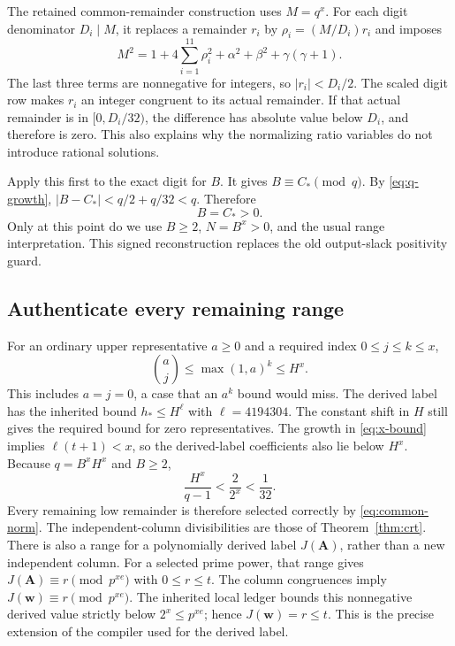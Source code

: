 \documentclass[11pt]{article}
\theoremstyle{definition}
\begin{document}
The retained common-remainder construction uses $M=q^x$. For each
digit denominator $D_i\mid M$, it replaces a remainder $r_i$ by
$\rho_i=(M/D_i)r_i$ and imposes
\begin{equation}\label{eq:common-norm}
 M^2=1+4\sum_{i=1}^{11}\rho_i^2+\alpha^2+\beta^2+\gamma(\gamma+1).
\end{equation}
The last three terms are nonnegative for integers, so $|r_i|<D_i/2$.
The scaled digit row makes $r_i$ an integer congruent to its actual
remainder. If that actual remainder is in $[0,D_i/32)$, the difference
has absolute value below $D_i$, and therefore is zero. This also explains
why the normalizing ratio variables do not introduce rational solutions.

Apply this first to the exact digit for $B$. It gives
$B\equiv C_*\pmod q$. By \eqref{eq:q-growth},
$|B-C_*|<q/2+q/32<q$. Therefore
\[
                         B=C_*>0.
\]
Only at this point do we use $B\ge2$, $N=B^x>0$, and the usual range
interpretation. This signed reconstruction replaces the old output-slack
positivity guard.

\subsection{Authenticate every remaining range}

For an ordinary upper representative $a\ge0$ and a required index
$0\le j\le k\le x$,
\[
 \binom aj\le\max(1,a)^k\le H^x.
\]
This includes $a=j=0$, a case that an $a^k$ bound would miss. The
derived label has the inherited bound $h_*\le H^{\ell}$ with
$\ell=4194304$. The constant shift in $H$ still gives the required
bound for zero representatives. The growth in \eqref{eq:x-bound}
implies $\ell(t+1)<x$, so the derived-label coefficients also lie below
$H^x$. Because $q=B^xH^x$ and $B\ge2$,
\[
                  \frac{H^x}{q-1}<\frac2{2^x}<\frac1{32}.
\]
Every remaining low remainder is therefore selected correctly by
\eqref{eq:common-norm}. The independent-column divisibilities are those
of Theorem~\ref{thm:crt}. There is also a range for a polynomially derived
label $J(\boldsymbol A)$, rather than a new independent column.
For a selected prime power, that range gives
$J(\boldsymbol A)\equiv r\pmod{p^{xe}}$ with $0\le r\le t$.
The column congruences imply
$J(\boldsymbol w)\equiv r\pmod{p^{xe}}$.
The inherited local ledger bounds this nonnegative derived value strictly
below $2^x\le p^{xe}$; hence $J(\boldsymbol w)=r\le t$.
This is the precise extension of the compiler used for the derived label.
\end{document}
